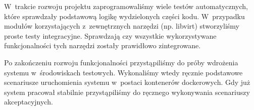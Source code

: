 \documentclass[../analiza-rozwiazania.tex]{subfiles}
\begin{document}
W~trakcie rozwoju projektu zaprogramowaliśmy wiele testów automatycznych, które sprawdzały podstawową logikę wydzielonych części kodu.
W~przypadku modułów korzystających z~zewnętrznych narzędzi (np. libvirt) stworzyliśmy proste testy integracyjne.
Sprawdzają czy wszystkie wykorzystywane funkcjonalności tych narzędzi zostały prawidłowo zintegrowane.

Po zakończeniu rozwoju funkcjonalności przystąpiliśmy do próby wdrożenia systemu w~środowiskach testowych.
Wykonaliśmy wtedy ręcznie podstawowe scenariusze uruchomienia systemu w~postaci kontenerów dockerowych.
Gdy już system pracował stabilnie przystąpiliśmy do ręcznego wykonywania scenariuszy akceptacyjnych.
\end{document}
